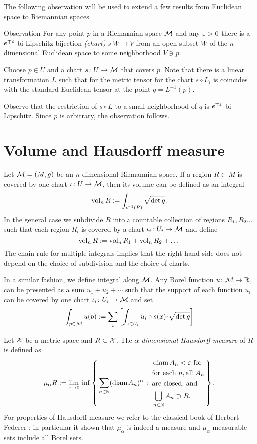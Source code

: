 The following observation will be used to extend a few results from Euclidean space to Riemannian spaces.

\begin{thm}{Observation}\label{obs:lip-chart}
For any point $p$ in a Riemannian space $\mathcal{M}$ and any $\varepsilon>0$ there is a $e^{\mp\varepsilon}$-bi-Lipschitz bijection \emph{(chart)} $s\:W\to V$ from an open subset $W$ of the $n$-dimensional Euclidean space to some neighborhood $V\ni p$.
\end{thm}

Choose $p\in U$ and a chart $s\colon U\to \mathcal{M}$ that covers $p$.
Note that there is a linear transformation $L$ such that for the metric tensor for the chart $s\circ L_i$ is coincides with the standard Euclidean tensor at the point $q=L^{-1}(p)$.

Observe that the restriction of $s\circ L$ to a small neighborhood of $q$ is $e^{\mp\varepsilon}$-bi-Lipschitz.
Since $p$ is arbitrary, the observation follows.
\qeds

\section{Volume and Hausdorff measure}

Let $\mathcal{M}=(M,g)$ be an $n$-dimensional Riemannian space.
If a region $R\subset M$ is covered by one chart $\iota\colon U\to \mathcal{M}$,
then its volume can be defined as an integral 
\[\operatorname{\rm vol}\nolimits_n R
\mathrel{:=}
\int_{\iota^{-1}(R)}\sqrt{\det{g}}.\]
In the general case we subdivide $R$ into a countable collection of regions $R_1,R_2\dots$ such that each region $R_i$ is covered by a chart $\iota_i\colon U_i\to \mathcal{M}$ and define
\[\operatorname{\rm vol}\nolimits_n R\mathrel{:=} \operatorname{\rm vol}\nolimits_n R_1+\operatorname{\rm vol}\nolimits_n R_2+\dots\]
The chain rule for multiple integrals implies that the right hand side does not depend on the choice of subdivision and the choice of charts.

In a similar fashion, we define integral along $\mathcal{M}$.
Any Borel function $u\colon\mathcal{M}\to \mathbb{R}$, can be presented as a sum $u_1+u_2+\cdots$ such that the support of each function $u_i$ can be covered by one chart $\iota_i\colon U_i\to \mathcal{M}$
and set 
\[\int_{p\in\spc{M}} u(p)
\df
\sum_i\left[\int_{x\in U_i} u_i\circ s(x)\cdot\sqrt{\det{g}}\right]
\]

Let $\mathcal{X}$ be a metric space and $R\subset \mathcal{X}$.
The \emph{$\alpha$-dimensional Hausdorff measure} of $R$ is defined as 
$$\mu_\alpha R
\mathrel{:=}
\lim_{\varepsilon\to0}
\,
\inf
\left\{\,{\sum_{n\in\mathbb{N}}(\operatorname{\rm diam}\nolimits A_n)^\alpha}\,:\,{\begin{aligned}
&\operatorname{\rm diam}\nolimits A_n<\varepsilon\ \text{for}
\\
&\text{for each}\ n,\text{all}\  A_n
\\
&\text{are closed, and} 
\\
& \bigcup_{n\in\mathbb{N}}A_n\supset R.
\end{aligned}
}\,\right\}.$$
For properties of Hausdorff measure we refer to the classical book of  Herbert Federer \cite{federer};
in particular it shown that $\mu_\alpha$ is indeed a measure and $\mu_\alpha$-measurable sets include all Borel sets.

